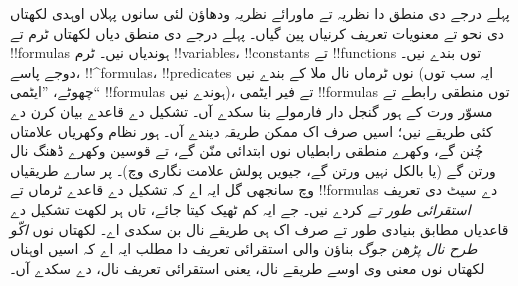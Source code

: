 \documentclass[../../../include/open-logic-section]{subfiles}
\begin{document}


پہلے درجے دی منطق دا نظریہ تے
ماورائے نظریہ ودھاؤن لئی سانوں
پہلاں اوہدی لکھتاں دی نحو تے
معنویات تعریف کرنیاں پین
گیاں۔ پہلے درجے دی منطق
دیاں لکھتاں ٹرم تے
!!{formula}s ہوندیاں نیں۔
ٹرم !!{variable}s،
!!{constant}s تے
!!{function}s توں
بندے نیں۔ دوجے پاسے،
!!^{formula}s،
!!{predicate}s نوں
ٹرماں نال ملا کے
بندے نیں (ایہ سب
توں چھوٹے، ”ایٹمی“
!!{formula}s ہوندے
نیں)، تے فیر ایٹمی
!!{formula}s توں
منطقی رابطے تے
مسوّر ورت کے ہور
گنجل دار فارمولے
بنا سکدے آں۔
تشکیل دے قاعدے
بیان کرن دے کئی
طریقے نیں؛ اسیں
صرف اک ممکن
طریقہ دیندے آں۔
ہور نظام وکھریاں
علامتاں چُنن گے،
وکھرے منطقی
رابطیاں نوں
ابتدائی منّن
گے، تے قوسین
وکھرے ڈھنگ
نال ورتن گے
(یا بالکل نہیں
ورتن گے، جیویں
پولش علامت
نگاری وچ)۔
پر سارے طریقیاں
وچ سانجھی گل
ایہ اے کہ تشکیل
دے قاعدے ٹرماں
تے !!{formula}s
دے سیٹ دی تعریف
\emph{استقرائی طور تے}
کردے نیں۔ جے
ایہ کم ٹھیک کیتا
جائے، تاں ہر لکھت
تشکیل دے قاعدیاں
مطابق بنیادی طور
تے صرف اک ہی
طریقے نال بن
سکدی اے۔ لکھتاں
نوں \emph{اکّو
طرح نال پڑھن
جوگ} بناؤن والی
استقرائی تعریف
دا مطلب ایہ اے
کہ اسیں اوہناں
لکھتاں نوں
معنی وی اوسے
طریقے نال، یعنی
استقرائی تعریف
نال، دے سکدے آں۔
\end{document}
